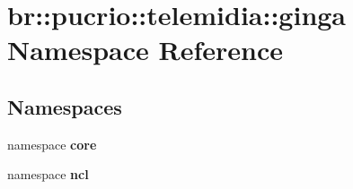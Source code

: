 \section{br::pucrio::telemidia::ginga Namespace Reference}
\label{namespacebr_1_1pucrio_1_1telemidia_1_1ginga}


\subsection*{Namespaces}
\begin{CompactItemize}
\item 
namespace {\bf core}
\item 
namespace {\bf ncl}
\end{CompactItemize}
